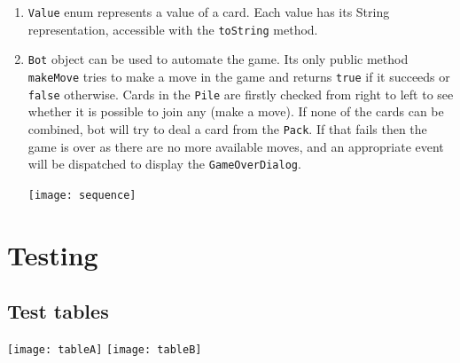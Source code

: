\documentclass[a4paper, 12pt, titlepage]{article}
\begin{document}
\begin{enumerate}
	\item \texttt{Value} enum represents a value of a card. Each value has its String 
		representation, accessible with the \texttt{toString} method.

	\item \texttt{Bot} object can be used to automate the game. Its only public method
		\texttt{makeMove} tries to make a move in the game and returns \texttt{true} if
		it succeeds or \texttt{false} otherwise. Cards in the \texttt{Pile} are firstly 
		checked from right to left to see whether it is possible to join any (make a 
		move). If none of the cards can be combined, bot will try to deal a card from 
		the \texttt{Pack}. If that fails then the game is over as there are no more
		available moves, and an appropriate event will be dispatched to display the
		\texttt{GameOverDialog}.
		
		\texttt{[image: sequence]}
	
\end{enumerate}

\section{Testing}
\subsection{Test tables}
\texttt{[image: tableA]}
\texttt{[image: tableB]}
\newpage
\end{document}

